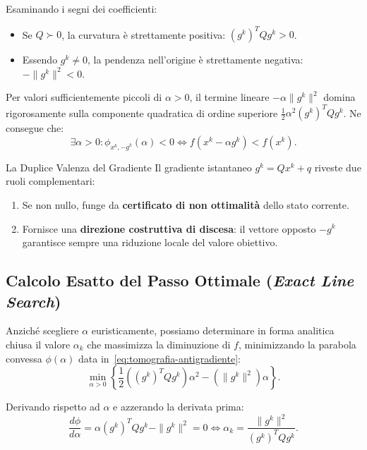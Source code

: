 Esaminando i segni dei coefficienti:
\begin{itemize}
    \item Se $Q \succ 0$, la curvatura \`e strettamente positiva: $(g^k)^T Q g^k > 0$.
    \item Essendo $g^k \neq 0$, la pendenza nell'origine \`e strettamente negativa: $-\|g^k\|^2 < 0$.
\end{itemize}
Per valori sufficientemente piccoli di $\alpha > 0$, il termine lineare $-\alpha \|g^k\|^2$ domina rigorosamente sulla componente quadratica di ordine superiore $\frac{1}{2} \alpha^2 (g^k)^T Q g^k$. Ne consegue che:
\begin{equation}
    \exists \alpha > 0 : \phi_{x^k, -g^k}(\alpha) < 0 \iff f(x^k - \alpha g^k) < f(x^k).
\end{equation}

\begin{noteblock}{La Duplice Valenza del Gradiente}
Il gradiente istantaneo $g^k = Q x^k + q$ riveste due ruoli complementari:
\begin{enumerate}
    \item Se non nullo, funge da \textbf{certificato di non ottimalit\`a} dello stato corrente.
    \item Fornisce una \textbf{direzione costruttiva di discesa}: il vettore opposto $-g^k$ garantisce sempre una riduzione locale del valore obiettivo.
\end{enumerate}
\end{noteblock}

\subsection{Calcolo Esatto del Passo Ottimale (\textit{Exact Line Search})}
Anzich\'e scegliere $\alpha$ euristicamente, possiamo determinare in forma analitica chiusa il valore $\alpha_k$ che massimizza la diminuzione di $f$, minimizzando la parabola convessa $\phi(\alpha)$ data in~\eqref{eq:tomografia-antigradiente}:
\begin{equation}
    \min_{\alpha > 0} \left\{ \frac{1}{2} \left( (g^k)^T Q g^k \right) \alpha^2 - \left( \|g^k\|^2 \right) \alpha \right\}.
\end{equation}

Derivando rispetto ad $\alpha$ e azzerando la derivata prima:
\begin{equation}
    \frac{d\phi}{d\alpha} = \alpha (g^k)^T Q g^k - \|g^k\|^2 = 0 \iff \alpha_k = \frac{\|g^k\|^2}{(g^k)^T Q g^k}.
    \label{eq:stepsize-ottimale}
\end{equation}

